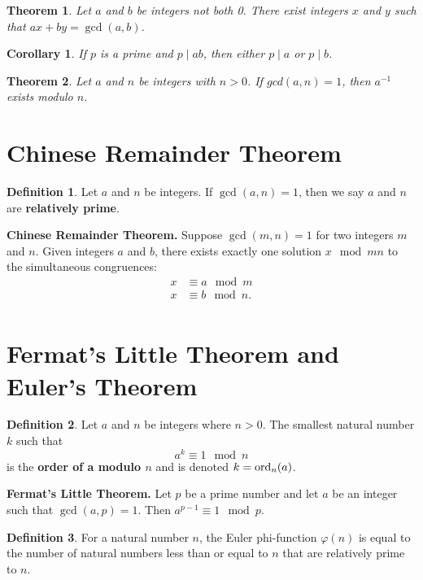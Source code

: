 \documentclass[12pt]{amsart}
\theoremstyle{plain}
\newtheorem{thm}{Theorem}
\newtheorem*{cor}{Corollary}
\theoremstyle{definition}
\newtheorem*{defn}{Definition}
\theoremstyle{remark}
\begin{document}
\begin{thm}
Let $a$ and $b$ be integers not both 0.  There exist integers $x$ and $y$ such that $ax+by = \gcd(a,b)$.
\end{thm}

\begin{cor}
If $p$ is a prime and $p \mid ab$, then either $p \mid a$ or $p \mid b$.
\end{cor}


\begin{thm}
Let $a$ and $n$ be integers with $n > 0$.  If $gcd(a,n) = 1$, then $a^{-1}$ exists modulo $n$.
\end{thm}

\section{Chinese Remainder Theorem}
\begin{defn}
Let $a$ and $n$ be integers.  If $\gcd(a,n) = 1$, then we say $a$ and $n$ are \textbf{relatively prime}.
\end{defn}

\noindent\textbf{Chinese Remainder Theorem.} Suppose $\gcd(m,n) = 1$ for two integers $m$ and $n$.  Given integers $a$ and $b$, there exists exactly one solution $x \mod mn$ to the simultaneous congruences:
\begin{align*}
x &\equiv a \mod m\\
x &\equiv b \mod n.\\
\end{align*}

\section{Fermat's Little Theorem and Euler's Theorem}
\begin{defn}
Let $a$ and $n$ be integers where $n > 0$.  The smallest natural number $k$ such that $$a^k \equiv 1 \mod n$$ is the \textbf{order of a modulo $n$} and is denoted $k = \textup{ord}_n(a)$.
\end{defn}

\noindent\textbf{Fermat's Little Theorem.} Let $p$ be a prime number and let $a$ be an integer such that $\gcd(a,p) = 1$. Then $a^{p-1} \equiv 1 \mod p$.


\begin{defn} For a natural number $n$, the Euler phi-function $\varphi(n)$ is equal to the number of natural numbers less than or equal to $n$ that are relatively prime to $n$.
\end{defn}
\end{document}
